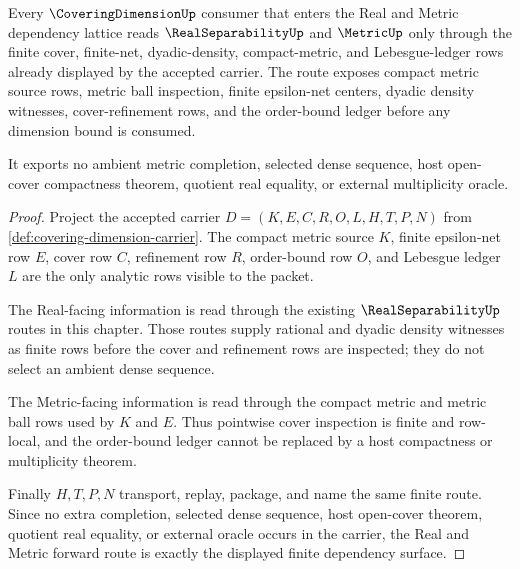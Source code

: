 \begin{theorem}
\label{thm:covering-dimension-real-metric-forward-route}
Every $\CoveringDimensionUp$ consumer that enters the Real and Metric dependency lattice reads $\RealSeparabilityUp$ and $\MetricUp$ only through the finite cover, finite-net, dyadic-density, compact-metric, and Lebesgue-ledger rows already displayed by the accepted carrier. The route exposes compact metric source rows, metric ball inspection, finite epsilon-net centers, dyadic density witnesses, cover-refinement rows, and the order-bound ledger before any dimension bound is consumed.

It exports no ambient metric completion, selected dense sequence, host open-cover compactness theorem, quotient real equality, or external multiplicity oracle.
\end{theorem}
\begin{proof}
Project the accepted carrier $D=(K,E,C,R,O,L,H,T,P,N)$ from \autoref{def:covering-dimension-carrier}. The compact metric source $K$, finite epsilon-net row $E$, cover row $C$, refinement row $R$, order-bound row $O$, and Lebesgue ledger $L$ are the only analytic rows visible to the packet.

The Real-facing information is read through the existing $\RealSeparabilityUp$ routes in this chapter. Those routes supply rational and dyadic density witnesses as finite rows before the cover and refinement rows are inspected; they do not select an ambient dense sequence.

The Metric-facing information is read through the compact metric and metric ball rows used by $K$ and $E$. Thus pointwise cover inspection is finite and row-local, and the order-bound ledger cannot be replaced by a host compactness or multiplicity theorem.

Finally $H,T,P,N$ transport, replay, package, and name the same finite route. Since no extra completion, selected dense sequence, host open-cover theorem, quotient real equality, or external oracle occurs in the carrier, the Real and Metric forward route is exactly the displayed finite dependency surface.
\end{proof}
